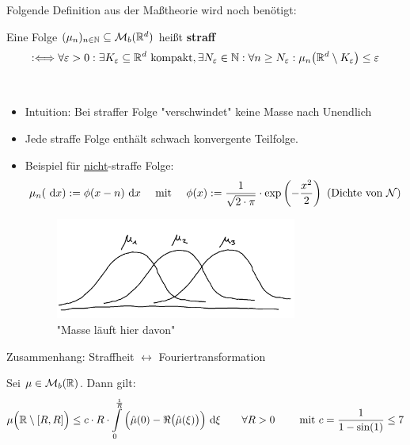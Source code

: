 Folgende Definition aus der Maßtheorie wird noch benötigt:

\begin{defi}[Straffheit]
	Eine Folge $(\mu_n)_{n\in\mathbb{N}}\subseteq\mathcal{M}_b(\mathbb{R}^d)$ heißt \textbf{straff}
	\begin{align*}
		:\Longleftrightarrow
		\forall\varepsilon>0:\exists K_\varepsilon\subseteq\mathbb{R}^d\text{ kompakt},\exists N_\varepsilon\in\mathbb{N}:\forall n\geq N_\varepsilon:
		\mu_n\big(\mathbb{R}^d\setminus K_\varepsilon\big)\leq\varepsilon
	\end{align*}
\end{defi}

\begin{bemerkung}\
	\begin{itemize}
		\item Intuition: Bei straffer Folge "verschwindet" keine Masse nach Unendlich
		\item Jede straffe Folge enthält schwach konvergente Teilfolge.
		\item Beispiel für \underline{nicht}-straffe Folge: 
		\begin{align*}
			\mu_n(\text{ d} x):=\phi(x-n)\text{ d} x
			\quad\text{ mit }\quad
			\phi(x):=\frac{1}{\sqrt{2\cdot\pi}}\cdot\exp\left(-\frac{x^2}{2}\right)\text{ (Dichte von }\mathcal{N})
		\end{align*}
		\begin{figure}[ht!]
			\begin{center}
				\includegraphics[width=0.75\textwidth]{./pics/Sketch5.png}
				\caption{"Masse läuft hier davon"}
				\label{AbbNichtStraffesMaß}
			\end{center}
		\end{figure}
	\end{itemize}
\end{bemerkung}

Zusammenhang: Straffheit $\longleftrightarrow$ Fouriertransformation

\begin{lemma}\label{lemma8.5}
	Sei $\mu\in\mathcal{M}_b(\mathbb{R})$.
	Dann gilt:
	\begin{align*}
		\mu\Big(\mathbb{R}\setminus[R,R]\Big)\leq
		c\cdot R\cdot\int\limits_0^{\frac{1}{R}}\Big(\hat{\mu}(0)-\Re\big(\hat{\mu}(\xi)\big)\Big)\text{ d}\xi
		\qquad\forall R>0\qquad
		\text{ mit } c=\frac{1}{1-\sin(1)}\leq 7
	\end{align*}
\end{lemma}

